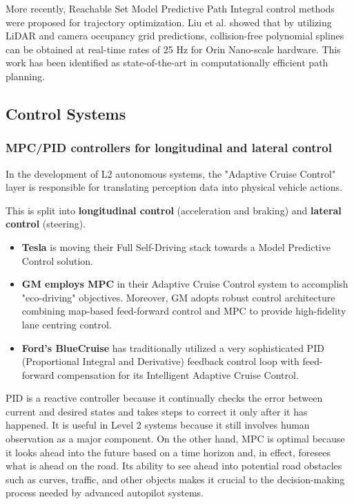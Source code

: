 \documentclass[12pt, a4paper]{report}
\begin{document}
More recently, Reachable Set Model Predictive Path Integral control methods were proposed for trajectory optimization. Liu et al. \cite{ref21} showed that by utilizing \ac{LiDAR} and camera occupancy grid predictions, collision-free polynomial splines can be obtained at real-time rates of 25 Hz for Orin Nano-scale hardware. This work has been identified as state-of-the-art in computationally efficient path planning.
\subsection{Control Systems}

\subsubsection{MPC/PID controllers for longitudinal and lateral control}

In the development of L2 autonomous systems, the "Adaptive Cruise Control" layer is responsible for translating perception data into physical vehicle actions.

This is split into \textbf{longitudinal control} (acceleration and braking) and \textbf{lateral control} (steering).

\begin{itemize}
    \item \textbf{Tesla} is moving their Full Self-Driving stack towards a Model Predictive Control solution.
    \item \textbf{GM employs MPC} in their Adaptive Cruise Control system to accomplish "eco-driving" objectives. Moreover, GM adopts robust control architecture combining map-based feed-forward control and MPC to provide high-fidelity lane centring control.
    \item \textbf{Ford's BlueCruise} has traditionally utilized a very sophisticated PID (Proportional Integral and Derivative) feedback control loop with feed-forward compensation for its Intelligent Adaptive Cruise Control.
\end{itemize}

PID is a reactive controller because it continually checks the error between current and desired states and takes steps to correct it only after it has happened. It is useful in Level 2 systems because it still involves human observation as a major component. On the other hand, MPC is optimal because it looks ahead into the future based on a time horizon and, in effect, foresees what is ahead on the road. Its ability to see ahead into potential road obstacles such as curves, traffic, and other objects makes it crucial to the decision-making process needed by advanced autopilot systems. \cite{ref6, ref7, ref8, ref9}
\end{document}
